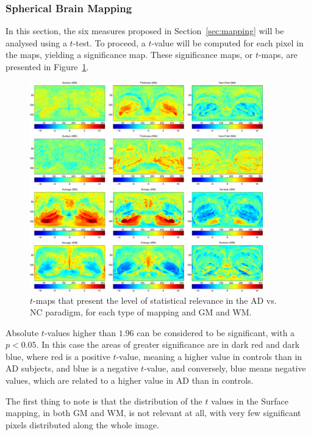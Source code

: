 \subsubsection{Spherical Brain Mapping}\label{sec:sbmttest}
In this section, the six measures proposed in Section~\ref{sec:mapping} will be analysed using a $t$-test. To proceed, a $t$-value will be computed for each pixel in the maps, yielding a significance map. These significance maps, or $t$-maps, are presented in Figure~\ref{fig:tmaps}. 

\begin{figure}[htp]
	\centering
	\includegraphics[width=0.9\textwidth]{Graphics/ch6/07-tmaps}
	\caption{$t$-maps that present the level of statistical relevance in the AD vs. NC paradigm, for each type of mapping and \ac{GM} and \ac{WM}. }
	\label{fig:tmaps}
\end{figure}

Absolute $t$-values higher than $1.96$ can be considered to be significant, with a $p<0.05$. In this case the areas of greater significance are in dark red and dark blue, where red is a positive $t$-value, meaning a higher value in controls than in AD subjects, and blue is a negative $t$-value, and conversely, blue means negative values, which are related to a higher value in AD than in controls. 

The first thing to note is that the distribution of the $t$ values in the Surface mapping, in both \ac{GM} and \ac{WM}, is not relevant at all, with very few significant pixels distributed along the whole image. 

